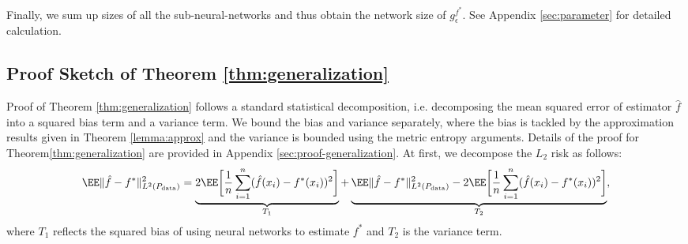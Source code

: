 Finally, we sum up sizes of all the sub-neural-networks and thus obtain the network size of $g^{f^*}_\epsilon$. See Appendix \ref{sec:parameter} for detailed calculation.%




\subsection{Proof Sketch of Theorem \ref{thm:generalization}}\label{proof:sketch-generalization}

Proof of Theorem \ref{thm:generalization} follows a standard statistical decomposition, i.e. decomposing the mean squared error of estimator $\hat{f}$ into a squared bias term and a variance term. We bound the bias and variance separately, where the bias is tackled by the approximation results given in Theorem \ref{lemma:approx} and the variance is bounded using the metric entropy arguments. 
Details of the proof for Theorem\ref{thm:generalization} are provided in Appendix \ref{sec:proof-generalization}.
At first, we decompose the $L_2$ risk as follows:
\begin{align*}
\EE \norm{\hat{f}-f^*}^2_{L^2(P_{\rm data})} = \underbrace{2 \EE \biggl [\frac{1}{n}\sum_{i=1}^n (\hat{f}(x_i) - f^*(x_i))^2 \biggr]}_{T_1}  +\underbrace{\EE\norm{\hat{f}-f^*}^2_{L^2(P_{\rm data})} - 2 \EE\biggl [\frac{1}{n}\sum_{i=1}^n (\hat{f}(x_i) - f^*(x_i))^2 \biggr]}_{T_2},
\end{align*}
where $T_1$ reflects the squared bias of using neural networks to estimate $f^*$ and $T_2$ is the variance term.

